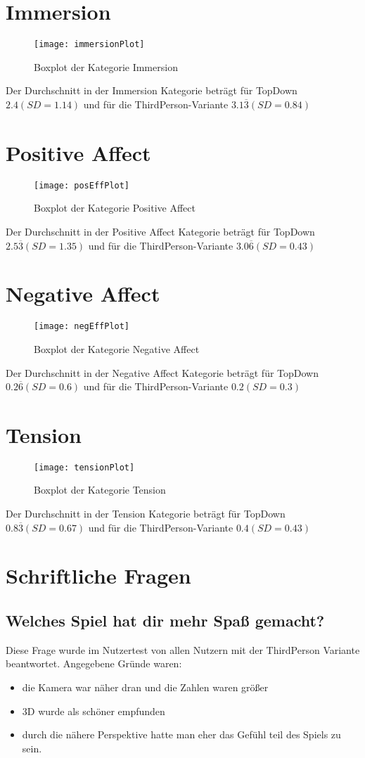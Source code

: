 \section{Immersion}
\begin{figure}[h!tb]
	\centering
	\texttt{[image: immersionPlot]}
	\caption{Boxplot der Kategorie Immersion\label{fig:immersionbox}}
\end{figure}
Der Durchschnitt in der Immersion Kategorie beträgt für TopDown  $2.4 (SD = 1.14)$ und für die ThirdPerson-Variante $3.1\overline{3} (SD =0.84 )$
\section{Positive Affect}
\begin{figure}[htb]
	\centering
	\texttt{[image: posEffPlot]}
	\caption{Boxplot der Kategorie Positive Affect\label{fig:poseffbox}}
\end{figure}
Der Durchschnitt in der Positive Affect Kategorie beträgt für TopDown  $2.5\overline{3} (SD = 1.35)$ und für die ThirdPerson-Variante $3.0\overline{6} (SD =0.43 )$
\section{Negative Affect}
\begin{figure}[h!tb]
	\centering
	\texttt{[image: negEffPlot]}
	\caption{Boxplot der Kategorie Negative Affect\label{fig:negeffbox}}
\end{figure}
Der Durchschnitt in der Negative Affect Kategorie beträgt für TopDown  $0.2\overline{6} (SD = 0.6)$ und für die ThirdPerson-Variante $0.2 (SD =0.3 )$
\section{Tension}
\begin{figure}[htb]
	\centering
	\texttt{[image: tensionPlot]}
	\caption{Boxplot der Kategorie Tension\label{fig:tensionbox}}
\end{figure}
Der Durchschnitt in der Tension Kategorie beträgt für TopDown  $0.8\overline{3} (SD = 0.67)$ und für die ThirdPerson-Variante $0.4 (SD =0.43 )$
\section{Schriftliche Fragen}
\subsection{Welches Spiel hat dir mehr Spaß gemacht?}
Diese Frage wurde im Nutzertest von allen Nutzern mit der ThirdPerson Variante beantwortet. Angegebene Gründe waren:
\begin{itemize}
\item die Kamera war näher dran und die Zahlen waren größer
\item 3D wurde als schöner empfunden
\item durch die nähere Perspektive hatte man eher das Gefühl teil des Spiels zu sein.
\end{itemize}
